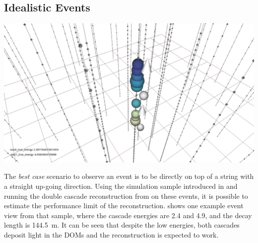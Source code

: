 \subsection{Idealistic Events}

\begin{marginfigure}
    \centering
    \includegraphics[trim=270 40 225 35, clip]{figures/model_independent_simulation/upgoing_e0_2.4_e1_4.9_v2.png}
    \caption[Event view of an idealistic double cascade event]{Event view of an idealistic double cascade event, with cascade energies of \SI{2.4}{\gev} and \SI{4.9}{\gev}, and a decay length of \SI{65.8}{\meter}. The colored spheres show the DOMs that have observed light, where the size is proportional to the number of observed photons and the color indicates the time (yellow is early, blue is late). The strings are shown as black lines, with small spheres indicating the DOM positions, and the true cascade vertices and directions are shown as white spheres with white arrows.}
\end{marginfigure}

The \textit{best case} scenario to observe an event is to be directly on top of a string with a straight up-going direction. Using the simulation sample introduced in  and running the double cascade reconstruction from  on these events, it is possible to estimate the performance limit of the reconstruction.  shows one example event view from that sample, where the cascade energies are \SI{2.4}{\gev} and \SI{4.9}{\gev}, and the decay length is \SI{144.5}{\meter}. It can be seen that despite the low energies, both cascades deposit light in the DOMs and the reconstruction is expected to work.

